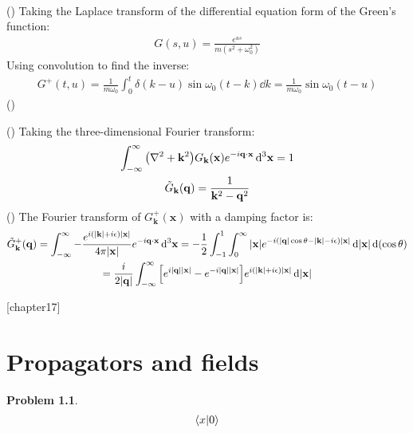 \documentclass{report}
\theoremstyle{definition}
\begin{document}
\begin{chapter16}
\begin{gather*}
	\end{gather*}
	()
	Taking the Laplace transform of the differential equation form of the Green's function:
	\begin{gather*}
		G(s,u) = \frac{e^{us}}{m(s^2 + \omega_0^2)}
	\end{gather*}
	Using convolution to find the inverse:
	\begin{gather*}
		G^+(t,u) = \frac{1}{m\omega_0}\int_0^{t} \delta(k-u) \sin \omega_0(t - k) \dd{k}  = \frac{1}{m\omega_0}\sin\omega_0(t-u)
	\end{gather*}
	()
\end{chapter16}
	
\begin{chapter16}\label{prob:4}
	()
	Taking the three-dimensional Fourier transform:
	\begin{gather*}
		\int_{-\infty}^{\infty} \pqty{\nabla^2 + \mathbf k^2}G_{\mathbf k}(\mathbf x)e^{-i\bf q\cdot x}\,\dd^3{\bf x} = 1 \\
		\tilde G_{\mathbf k}(\mathbf q) = \frac{1}{\mathbf k^2 - \mathbf q^2}
	\end{gather*}
	()
	The Fourier transform of $G^+_{\mathbf k}(\mathbf x)$ with a damping factor is:
	\begin{gather*}
		\tilde G^+_{\mathbf k}(\mathbf q) = \int_{-\infty}^{\infty} -\frac{e^{i\pqty{\abs{\mathbf k} + i\epsilon}\abs{\mathbf x}}}{4\pi\abs{\mathbf x}}e^{-i\bf q\cdot x}\,\dd^3{\bf x} = -\frac{1}{2}\int_{-1}^{1}\int_0^{\infty}{\abs{\mathbf x}e^{-i\pqty{\abs{\mathbf q}\cos\theta -\abs{\mathbf k} - i\epsilon}\abs{\mathbf x}}} \dd{\abs{\mathbf x}}\dd\pqty{\cos\theta} \\
		= \frac{i}{2\abs{\mathbf q}}\int_{-\infty}^{\infty} \bqty{e^{i\abs{\mathbf q}\abs{\mathbf x}}- e^{-i\abs{\mathbf q}\abs{\mathbf x}}}e^{i\pqty{\abs{\mathbf k} + i\epsilon}\abs{\mathbf x}} \dd{\abs{\mathbf x}}
	\end{gather*}
\end{chapter16}

\newtheorem{chapter17}{Problem}
[chapter17]
\chapter{Propagators and fields}

\begin{chapter17}\label{prob:1}
	\begin{gather*}
		\braket{x}{0}
	\end{gather*}
\end{chapter17}
\end{document}
